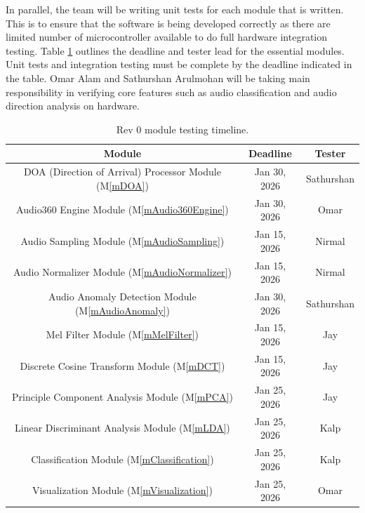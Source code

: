 \documentclass[12pt, titlepage]{article}
\newcommand{\mref}[1]{M\ref{#1}}
\begin{document}
In parallel, the team will be writing unit tests for each module that is
written. This is to ensure that the software is being developed correctly as
there are limited number of microcontroller available to do full hardware
integration testing. Table \ref{table:rev0_testing_timeline} outlines the
deadline and tester lead for the essential modules. Unit tests and integration
testing must be complete by the deadline indicated in the table.
Omar Alam and Sathurshan Arulmohan will be taking main
responsibility in verifying core features such as audio classification and
audio direction analysis on hardware. 
\begin{table}[H]
    \centering
    \begin{tabular}{|c|c|c|}
        \hline
        \textbf{Module} & \textbf{Deadline} & \textbf{Tester} \\ \hline
        DOA (Direction of Arrival) Processor Module (\mref{mDOA})
          & Jan 30, 2026 & Sathurshan \\ 
        Audio360 Engine Module (\mref{mAudio360Engine}) & Jan 30, 2026
          & Omar \\
        Audio Sampling Module (\mref{mAudioSampling}) & Jan 15, 2026
          & Nirmal \\
        Audio Normalizer Module (\mref{mAudioNormalizer}) & Jan 15, 2026
          & Nirmal \\
        Audio Anomaly Detection Module (\mref{mAudioAnomaly}) & Jan 30, 2026
          & Sathurshan \\
        Mel Filter Module (\mref{mMelFilter}) & Jan 15, 2026
          & Jay \\
        Discrete Cosine Transform Module (\mref{mDCT}) & Jan 15, 2026 
          & Jay \\
        Principle Component Analysis Module (\mref{mPCA}) & Jan 25, 2026
          & Jay \\
        Linear Discriminant Analysis Module (\mref{mLDA}) & Jan 25, 2026
          & Kalp \\
        Classification Module (\mref{mClassification}) & Jan 25, 2026
          & Kalp \\
        Visualization Module (\mref{mVisualization}) & Jan 25, 2026
          & Omar \\
        \hline
    \end{tabular}
    \caption{Rev 0 module testing timeline.}
    \label{table:rev0_testing_timeline}
\end{table}

\newpage



\newpage{}
\end{document}
